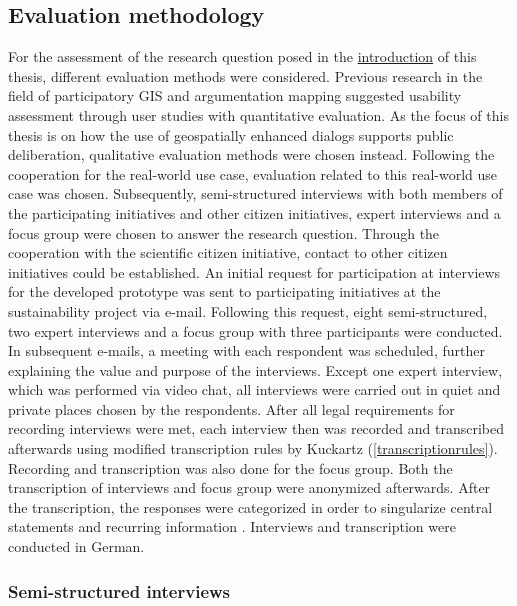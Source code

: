 \subsection{Evaluation methodology}
\label{subchap:ev_methodology}
For the assessment of the research question posed in the \hyperref[chap:introduction]{introduction} of this thesis, different evaluation methods were considered. Previous research in the field of participatory GIS and argumentation mapping suggested usability assessment through user studies with quantitative evaluation. As the focus of this thesis is on how the use of geospatially enhanced dialogs supports public deliberation, qualitative evaluation methods were chosen instead. Following the cooperation for the real-world use case, evaluation related to this real-world use case was chosen. Subsequently, semi-structured interviews with both members of the participating initiatives and other citizen initiatives, expert interviews and a focus group were chosen to answer the research question. 
Through the cooperation with the scientific citizen initiative, contact to other citizen initiatives could be established. An initial request for participation at interviews for the developed prototype was sent to participating initiatives at the sustainability project via e-mail. Following this request, eight semi-structured, two expert interviews and a focus group with three participants were conducted. In subsequent e-mails, a meeting with each respondent was scheduled, further explaining the value and purpose of the interviews. Except one expert interview, which was performed via video chat, all interviews were carried out in quiet and private places chosen by the respondents. After all legal requirements for recording interviews were met, each interview then was recorded and transcribed afterwards using modified transcription rules by Kuckartz \cite{kuckartz2007} (\ref{transcriptionrules}). Recording and transcription was also done for the focus group. Both the transcription of interviews and focus group were anonymized afterwards. After the transcription, the responses were categorized in order to singularize central statements and recurring information \cite{naderer2007auswertung}. Interviews and transcription were conducted in German.


\subsubsection{Semi-structured interviews}

